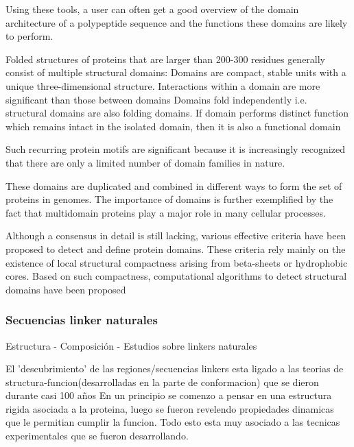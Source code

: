 Using these
tools, a user can often get a good overview of the domain
architecture of a polypeptide sequence and the functions these
domains are likely to perform.




Folded structures of proteins that are larger than 200-300 residues generally consist of multiple structural domains:
Domains are compact, stable units with a unique three-dimensional structure. 
Interactions within a domain are more significant than those between domains
Domains fold independently i.e. structural domains are also folding domains. If domain performs distinct function which remains intact in the isolated domain, then it is also a functional domain




Such recurring protein motifs are significant because it is increasingly recognized that there are only a limited number of domain families in nature.









These domains are duplicated and combined in different ways to form the set of proteins in genomes. 
The importance of domains is further exemplified by the fact that multidomain proteins play a major role in many cellular processes.

Although a consensus in detail is still lacking, various effective criteria have been proposed to detect and define protein domains.
These criteria rely mainly on the existence of local structural compactness arising from beta-sheets or hydrophobic cores. 
Based on such compactness, computational algorithms to detect structural domains have been proposed








\subsubsection{Secuencias linker naturales}
Estructura - Composición -  Estudios sobre linkers naturales


El 'descubrimiento' de las regiones/secuencias linkers esta ligado a las teorias de structura-funcion(desarrolladas en la parte de conformacion) que se dieron durante casi 100 años
En un principio se comenzo a pensar en una estructura rigida asociada a la proteina, luego se fueron revelendo propiedades dinamicas que le permitian cumplir la funcion. 
Todo esto esta muy asociado a las tecnicas experimentales que se fueron desarrollando.

